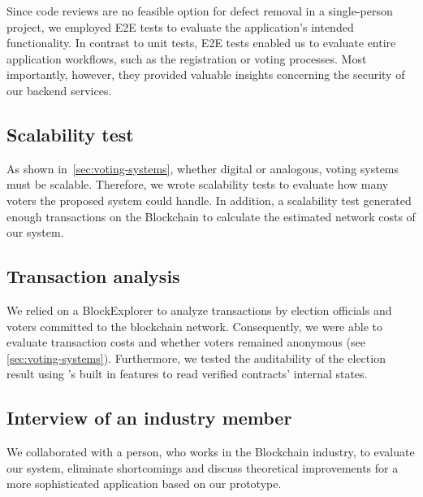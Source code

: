 Since code reviews are no feasible option for defect removal in a single-person project, we employed \gls{E2E} tests to evaluate the application’s intended functionality.
In contrast to unit tests, \gls{E2E} tests enabled us to evaluate entire application workflows, such as the registration or voting processes.
Most importantly, however, they provided valuable insights concerning the security of our backend services.

\subsection{Scalability test}\label{subsec:scalability-test}

As shown in~\cref{sec:voting-systems}, whether digital or analogous, voting systems must be scalable.
Therefore, we wrote scalability tests to evaluate how many voters the proposed system could handle.
In addition, a scalability test generated enough transactions on the \gls{Blockchain} to calculate the estimated network costs of our system.

\subsection{Transaction analysis}\label{subsec:transaction-analysis}

We relied on a \gls{BlockExplorer} to analyze transactions by election officials and voters committed to the blockchain network.
Consequently, we were able to evaluate transaction costs and whether voters remained anonymous (see \cref{sec:voting-systems}).
Furthermore, we tested the auditability of the election result using 's built in features to read verified contracts' internal states.

\subsection{Interview of an industry member}\label{subsec:interview-of-industry-member}

We collaborated with a person, who works in the \gls{Blockchain} industry, to evaluate our system, eliminate shortcomings and discuss theoretical improvements for a more sophisticated application based on our prototype.